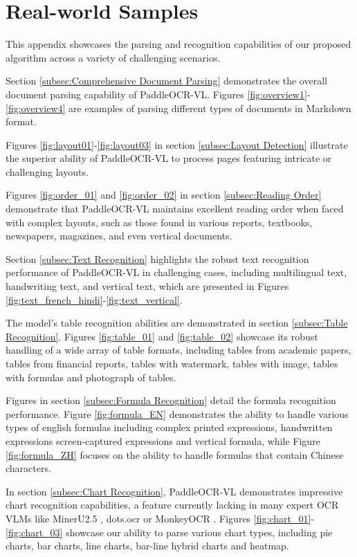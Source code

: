 \documentclass[11pt, a4paper,logo,  copyright, nonumbering]{paddleocr}
\begin{document}
\clearpage 
\newpage
\section{Real-world Samples}

This appendix showcases the parsing and recognition capabilities of our proposed algorithm across a variety of challenging scenarios.

Section \ref{subsec:Comprehensive Document Parsing} demonstrates the overall document parsing capability of PaddleOCR-VL. Figures \ref{fig:overview1}-\ref{fig:overview4} are examples of parsing different types of documents in Markdown format.

Figures \ref{fig:layout01}-\ref{fig:layout03} in section \ref{subsec:Layout Detection} illustrate the superior ability of PaddleOCR-VL to process pages featuring intricate or challenging layouts.

Figures \ref{fig:order_01} and \ref{fig:order_02} in section \ref{subsec:Reading Order} demonstrate that PaddleOCR-VL maintains excellent reading order when faced with complex layouts, such as those found in various reports, textbooks, newspapers, magazines, and even vertical documents.

Section \ref{subsec:Text Recognition} highlights the robust text recognition performance of PaddleOCR-VL in challenging cases, including multilingual text, handwriting text, and vertical text, which are presented in Figures \ref{fig:text_french_hindi}-\ref{fig:text_vertical}.

The model's table recognition abilities are demonstrated in section \ref{subsec:Table Recognition}. Figures \ref{fig:table_01} and \ref{fig:table_02} showcase its robust handling of a wide array of table formats, including tables from academic papers, tables from financial reports, tables with watermark, tables with image, tables with formulas and photograph of tables.

Figures in section \ref{subsec:Formula Recognition} detail the formula recognition performance. Figure \ref{fig:formula_EN} demonstrates the ability to handle various types of english formulas including complex printed expressions, handwritten expressions screen-captured expressions and vertical formula, while Figure \ref{fig:formula_ZH} focuses on the ability to handle formulas that contain Chinese characters.

In section \ref{subsec:Chart Recognition}, PaddleOCR-VL demonstrates impressive chart recognition capabilities, a feature currently lacking in many expert OCR VLMs like MinerU2.5 \cite{MinerU2}, dots.ocr \cite{dotsocr} or MonkeyOCR \cite{li2025monkeyocr}. Figures \ref{fig:chart_01}-\ref{fig:chart_03} showcase our ability to parse various chart types, including pie charts, bar charts, line charts, bar-line hybrid charts and heatmap.
\end{document}
